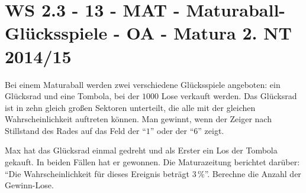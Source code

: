 \section{WS 2.3 - 13 - MAT - Maturaball-Glücksspiele - OA - Matura 2. NT 2014/15}

\begin{beispiel}[WS 2.3]{1} %
				Bei einem Maturaball werden zwei verschiedene Glücksspiele angeboten: ein Glücksrad und eine Tombola, bei der $1000$ Lose verkauft werden. Das Glücksrad ist in zehn gleich großen Sektoren unterteilt, die alle mit der gleichen Wahrscheinlichkeit auftreten können. Man gewinnt, wenn der Zeiger nach Stillstand des Rades auf das Feld der "`$1$"' oder der "`$6$"' zeigt.
				
				Max hat das Glücksrad einmal gedreht und als Erster ein Los der Tombola gekauft. In beiden Fällen hat er gewonnen. Die Maturazeitung berichtet darüber: "`Die Wahrscheinlichkeit für dieses Ereignis beträgt $3\,\%$"'. Berechne die Anzahl der Gewinn-Lose.\\
				
\end{beispiel}